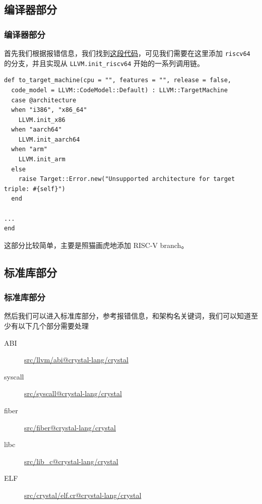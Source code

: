 \documentclass[UTF-8]{ctexbeamer}
\begin{document}
\subsection{编译器部分}
\begin{frame}[fragile]
	\frametitle{编译器部分}


	首先我们根据报错信息，我们找到\href{https://github.com/crystal-lang/crystal/blob/master/src/compiler/crystal/codegen/target.cr#L154}{这段代码}，可见我们需要在这里添加 \verb|riscv64| 的分支，并且实现从 \verb|LLVM.init_riscv64| 开始的一系列调用链。

	\begin{verbatim}
def to_target_machine(cpu = "", features = "", release = false,
  code_model = LLVM::CodeModel::Default) : LLVM::TargetMachine
  case @architecture
  when "i386", "x86_64"
    LLVM.init_x86
  when "aarch64"
    LLVM.init_aarch64
  when "arm"
    LLVM.init_arm
  else
    raise Target::Error.new("Unsupported architecture for target triple: #{self}")
  end

...
end
	\end{verbatim}

	这部分比较简单，主要是照猫画虎地添加 RISC-V branch。

\end{frame}

\subsection{标准库部分}
\begin{frame}[fragile]
	\frametitle{标准库部分}


	然后我们可以进入标准库部分，参考报错信息，和架构名关键词，我们可以知道至少有以下几个部分需要处理

	\begin{description}
		\item[ABI] \href{https://github.com/crystal-lang/crystal/tree/master/src/llvm/abi}{src/llvm/abi@crystal-lang/crystal}
		\item[syscall] \href{https://github.com/crystal-lang/crystal/tree/master/src/syscall}{src/syscall@crystal-lang/crystal}
		\item[fiber] \href{https://github.com/crystal-lang/crystal/tree/master/src/fiber}{src/fiber@crystal-lang/crystal}
		\item[libc] \href{https://github.com/crystal-lang/crystal/tree/master/src/lib_c}{src/lib\_c@crystal-lang/crystal}
		\item[ELF] \href{https://github.com/crystal-lang/crystal/blob/master/src/crystal/elf.cr}{src/crystal/elf.cr@crystal-lang/crystal}
	\end{description}

\end{frame}
\end{document}
